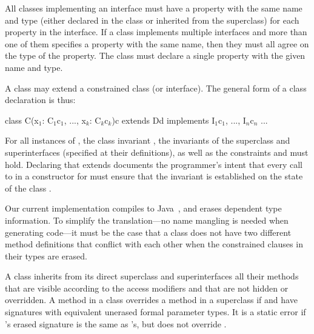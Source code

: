 All classes implementing an interface must have a property
with the same name and
type (either declared in the class or inherited from the superclass)
for each property in the interface. If a class implements
multiple interfaces and more than one of them specifies a property
with the same name, then they must all agree on the type of the
property. The class must declare a single property with the given name
and type.

A class may extend a constrained class (or interface).
The general form of a class declaration is thus:
\begin{xten}
class C(x$_1$: C$_1${c$_1$}, ..., x$_k$: C$_k${c$_k$}){c}
  extends D{d}
  implements I$_1${c$_1$}, ..., I$_n${c$_n$} {...}
\end{xten}
\noindent
For all instances of , the class invariant ,
the invariants of the superclass and superinterfaces (specified at
their definitions),
as well as the constraints  and  must hold.
Declaring that  extends 
documents the programmer's intent that
every call to  in a constructor for  must ensure
that the invariant  is established on the state of the class
.



Our current implementation compiles \Xten{} to Java~\cite{Java3}, and erases
dependent type information.  To simplify the translation---no
name mangling is needed when generating code---it
must be the case that a class does not have two different method
definitions that conflict with each other when the constrained
clauses in their types are erased.

A class inherits from its direct superclass and
superinterfaces all their methods that are visible according to the access
modifiers and that are not hidden or overridden.  A method
 in a class  overrides a method  in a
superclass  if  and  have signatures
with equivalent unerased formal parameter types.
It is a static error if 's erased signature is the same
as 's, but  does not override .

